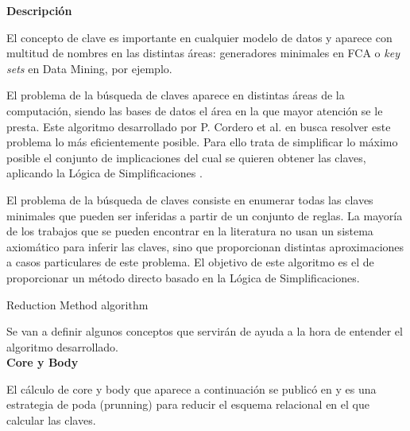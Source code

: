 \textbf{Descripci\'on} 

El concepto de clave es importante en cualquier modelo de datos y aparece con multitud de nombres en las distintas \'areas: generadores minimales en FCA o \textit{key sets} en Data Mining, por ejemplo.

El problema de la b\'usqueda de claves aparece en distintas \'areas de la computaci\'on, siendo las bases de datos el \'area en la que mayor atenci\'on se le presta. Este algoritmo desarrollado por P. Cordero et al. en  \cite{Reduction} busca resolver este problema lo m\'as eficientemente posible. Para ello trata de simplificar lo m\'aximo posible el conjunto de implicaciones del cual se quieren obtener las claves, aplicando la L\'ogica de Simplificaciones \cite{Cordero2002}.

El problema de la b\'usqueda de claves consiste en enumerar todas las claves minimales que pueden ser inferidas a partir de un conjunto de reglas. La mayor\'ia de los trabajos que se pueden encontrar en la literatura no usan un sistema axiom\'atico para inferir las claves, sino que proporcionan distintas aproximaciones a casos particulares de este problema. El objetivo de este algoritmo es el de proporcionar un m\'etodo directo basado en la L\'ogica de Simplificaciones.\\

\IncMargin{1em}
\begin{algorithm}[H]
    \SetAlgoLined
    \DontPrintSemicolon
    \caption{Reduction Method algorithm}\label{alg:3}
\end{algorithm}\DecMargin{1em}
\newpage
Se van a definir algunos conceptos que servir\'an de ayuda a la hora de entender el algoritmo desarrollado.\\

\textbf{Core y Body}

El c\'alculo de core y body que aparece a continuaci\'on se public\'o en \cite{Reduction} y es una estrategia de poda (prunning) para reducir el esquema relacional en el que calcular las claves. 

